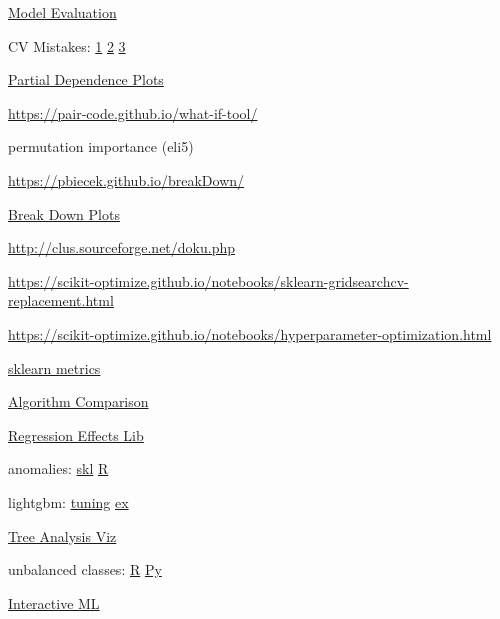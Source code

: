 \documentclass[]{book}
\begin{document}
\href{http://blog.dato.com/how-to-evaluate-machine-learning-models-part-1-orientation}{Model
Evaluation}

CV Mistakes:
\href{http://betatim.github.io/posts/cross-validation-gone-wrong/}{1}
\textbar{}
\href{http://www.alfredo.motta.name/cross-validation-done-wrong/}{2}
\textbar{} \href{http://robjhyndman.com/hyndsight/crossvalidation/}{3}

\href{https://cran.r-project.org/web/packages/pdp/pdp.pdf}{Partial
Dependence Plots}

\url{https://pair-code.github.io/what-if-tool/}

permutation importance (eli5)

\url{https://pbiecek.github.io/breakDown/}

\href{https://cran.r-project.org/web/packages/breakDown/index.html}{Break
Down Plots}

\url{http://clus.sourceforge.net/doku.php}

\url{https://scikit-optimize.github.io/notebooks/sklearn-gridsearchcv-replacement.html}

\url{https://scikit-optimize.github.io/notebooks/hyperparameter-optimization.html}

\href{http://scikit-learn.org/stable/modules/model_evaluation.html\#function-for-prediction-error-metrics}{sklearn
metrics}

\href{https://docs.google.com/spreadsheets/d/16i47Wmjpj8k-mFRk-NnXXU5tmSQz8h37YxluDV8Zy9U/edit\#gid=0}{Algorithm
Comparison}

\href{https://www.rdocumentation.org/packages/yhat/versions/2.0-0}{Regression
Effects Lib}

anomalies:
\href{http://scikit-learn.org/stable/modules/outlier_detection.html}{skl}
\textbar{} \href{https://business-science.github.io/anomalize/}{R}

lightgbm:
\href{https://medium.com/@pushkarmandot/https-medium-com-pushkarmandot-what-is-lightgbm-how-to-implement-it-how-to-fine-tune-the-parameters-60347819b7fc}{tuning}
\textbar{}
\href{https://www.kaggle.com/ezietsman/simple-python-lightgbm-example}{ex}

\href{http://etetoolkit.org/}{Tree Analysis Viz}

unbalanced classes:
\href{https://cran.r-project.org/web/packages/imbalance/index.html}{R}
\textbar{}
\href{http://contrib.scikit-learn.org/imbalanced-learn/stable/}{Py}

\href{http://www.creativeai.net/posts/eivW6BvrrpyPf282d/interactive-machine-learning-an-overview-in-5-videos}{Interactive
ML}
\end{document}
